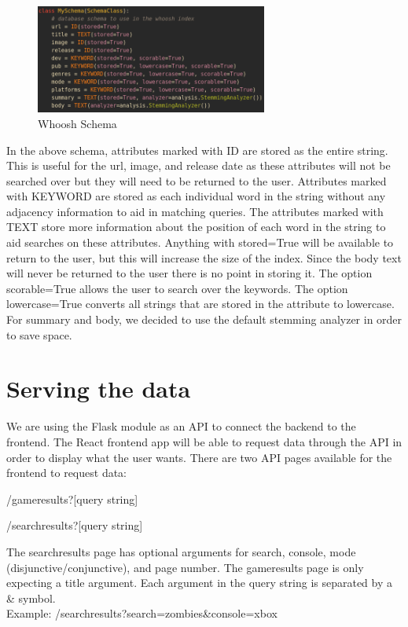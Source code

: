\begin{figure}[h]
\includegraphics[width=3in]{whooshSchema}
\caption{Whoosh Schema}
\label{fig:whooshschema}
\end{figure}

In the above schema, attributes marked with ID are stored as the entire string. This is useful for the url, image, and release date as these attributes will not be searched over but they will need to be returned to the user. Attributes marked with KEYWORD are stored as each individual word in the string without any adjacency information to aid in matching queries. The attributes marked with TEXT store more information about the position of each word in the string to aid searches on these attributes. Anything with stored=True will be available to return to the user, but this will increase the size of the index. Since the body text will never be returned to the user there is no point in storing it. The option scorable=True allows the user to search over the keywords. The option lowercase=True converts all strings that are stored in the attribute to lowercase. For summary and body, we decided to use the default stemming analyzer in order to save space.

\section{Serving the data}
We are using the Flask module as an API to connect the backend to the frontend. The React frontend app will be able to request data through the API in order to display what the user wants. There are two API pages available for the frontend to request data:

/gameresults?[query string]

/searchresults?[query string]

The searchresults page has optional arguments for search, console, mode (disjunctive/conjunctive), and page number. The gameresults page is only expecting a title argument. Each argument in the query string is separated by a \& symbol.\\
Example: /searchresults?search=zombies\&console=xbox

